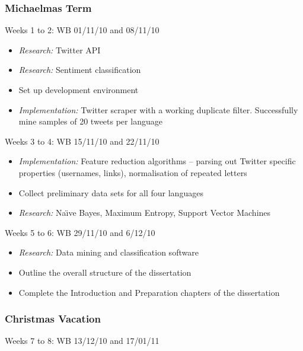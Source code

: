 \subsubsection*{Michaelmas Term}

\noindent
Weeks 1 to 2: WB 01/11/10 and 08/11/10

\begin{itemize}

\item \emph{Research:} Twitter API
\item \emph{Research:} Sentiment classification
\item Set up development environment
\item \emph{Implementation:} Twitter scraper with a working duplicate filter. Successfully mine samples of 20 tweets per language

\end{itemize}

\noindent
Weeks 3 to 4: WB 15/11/10 and 22/11/10

\begin{itemize}

\item \emph{Implementation:} Feature reduction algorithms -- parsing out Twitter specific properties (usernames, links), normalisation of repeated letters
\item Collect preliminary data sets for all four languages
\item \emph{Research:} Na\"{\i}ve Bayes, Maximum Entropy, Support Vector Machines

\end{itemize}

\noindent
Weeks 5 to 6: WB 29/11/10 and 6/12/10

\begin{itemize}

\item \emph{Research:} Data mining and classification software
\item Outline the overall structure of the dissertation
\item Complete the Introduction and Preparation chapters of the dissertation

\end{itemize}

\subsubsection*{Christmas Vacation}

\noindent
Weeks 7 to 8: WB 13/12/10 and 17/01/11

